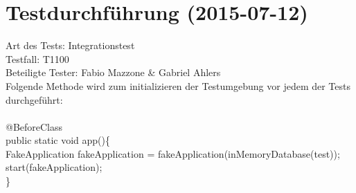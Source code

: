 \chapter{Testdurchführung (2015-07-12)}

Art des Tests: Integrationstest\\
Testfall: T1100\\
Beteiligte Tester: Fabio Mazzone \& Gabriel Ahlers\\

Folgende Methode wird zum initializieren der Testumgebung vor jedem der Tests durchgeführt:\\\\
\hspace*{0mm}@BeforeClass \\
\hspace*{0mm}public static void app()\{ \\
\hspace*{3mm}FakeApplication fakeApplication = fakeApplication(inMemoryDatabase(\grqq test\grqq)); \\
\hspace*{3mm}start(fakeApplication); \\
\hspace*{0mm}\} \\\\

